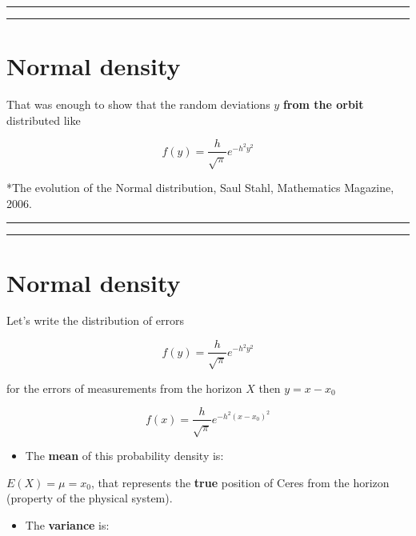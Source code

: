 \documentclass[
]{book}
\providecommand{\tightlist}{%
  \setlength{\itemsep}{0pt}\setlength{\parskip}{0pt}}
\begin{document}
\begin{center}\rule{0.5\linewidth}{0.5pt}\end{center}

\begin{center}\rule{0.5\linewidth}{0.5pt}\end{center}

\hypertarget{normal-density-3}{%
\section{Normal density}\label{normal-density-3}}

That was enough to show that the random deviations \(y\) \textbf{from the orbit} distributed like

\[f(y)=\frac{h}{\sqrt{\pi}}e^{-h^2y^2}\]

*The evolution of the Normal distribution, Saul Stahl, Mathematics Magazine, 2006.

\begin{center}\rule{0.5\linewidth}{0.5pt}\end{center}

\begin{center}\rule{0.5\linewidth}{0.5pt}\end{center}

\hypertarget{normal-density-4}{%
\section{Normal density}\label{normal-density-4}}

Let's write the distribution of errors

\[f(y)=\frac{h}{\sqrt{\pi}}e^{-h^2y^2}\]

for the errors of measurements from the horizon \(X\) then \(y=x-x_0\)

\[f(x)=\frac{h}{\sqrt{\pi}}e^{-h^2(x-x_0)^2}\]

\begin{itemize}
\tightlist
\item
  The \textbf{mean} of this probability density is:
\end{itemize}

\(E(X)=\mu=x_0\), that represents the \textbf{true} position of Ceres from the horizon (property of the physical system).

\begin{itemize}
\tightlist
\item
  The \textbf{variance} is:
\end{itemize}
\end{document}
